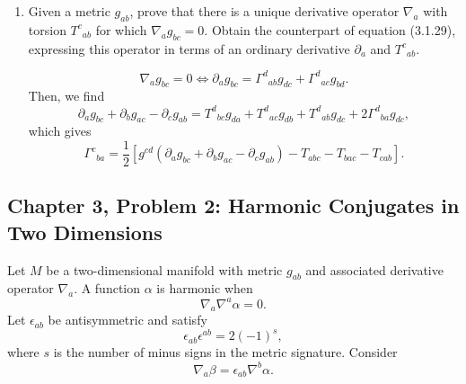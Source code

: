 \begin{enumerate}[label=\alph*)]
    \item Given a metric $g_{ab}$, prove that there is a unique derivative
    operator $\nabla_a$ with torsion $T^c{}_{ab}$ for which
    $\nabla_ag_{bc}=0$. Obtain the counterpart of equation (3.1.29), expressing
    this operator in terms of an ordinary derivative $\partial_a$ and
    $T^c{}_{ab}$.
    \begin{solution}
        \begin{equation}
            \nabla_a g_{bc} = 0 \iff \partial_a g_{bc}  =\Gamma^d{}_{ab}g_{dc} + \Gamma^d{}_{ac}g_{bd}.
        \end{equation}
        Then, we find
        \begin{equation}
            \partial_a g_{bc} + \partial_b g_{ac} - \partial_c g_{ab} = T^d{}_{bc}g_{da} + T^d{}_{ac}g_{db} + T^d{}_{ab}g_{dc} +2\Gamma^d{}_{ba}g_{dc},
        \end{equation}
        which gives
        \begin{equation}
            \Gamma^c{}_{ba} = \frac{1}{2}\left[g^{cd}(\partial_ag_{bc} + \partial_b g_{ac} - \partial_c g_{ab}) - T_{abc} - T_{bac} - T_{cab} \right].
        \end{equation}
    \end{solution}
\end{enumerate}

\subsection{Chapter 3, Problem 2: Harmonic Conjugates in Two Dimensions}

Let $M$ be a two-dimensional manifold with metric $g_{ab}$ and associated
derivative operator $\nabla_a$. A function $\alpha$ is harmonic when
\begin{equation}
    \nabla_a\nabla^a\alpha=0.
\end{equation}
Let $\epsilon_{ab}$ be antisymmetric and satisfy
\begin{equation}
    \epsilon_{ab}\epsilon^{ab}=2(-1)^s,
\end{equation}
where $s$ is the number of minus signs in the metric signature. Consider
\begin{equation}
    \nabla_a\beta=\epsilon_{ab}\nabla^b\alpha.
\end{equation}

